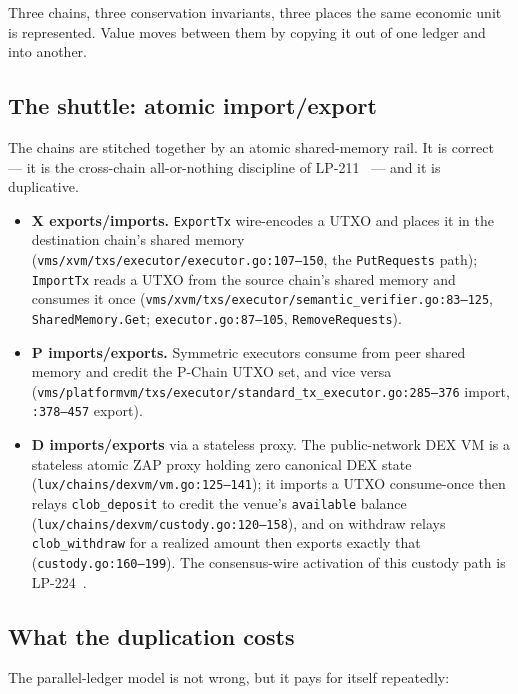 \noindent Three chains, three conservation invariants, three places the
same economic unit is represented. Value moves between them by copying
it out of one ledger and into another.

\subsection{The shuttle: atomic import/export}

The chains are stitched together by an atomic shared-memory rail. It
is correct --- it is the cross-chain all-or-nothing discipline of
LP-211~\cite{lp211} --- and it is duplicative.

\begin{itemize}[leftmargin=2em]
\item \textbf{X exports/imports.} \IMPL{} \texttt{ExportTx} wire-encodes
  a UTXO and places it in the destination chain's shared memory
  (\texttt{vms/xvm/txs/executor/executor.go:107--150}, the
  \texttt{PutRequests} path); \texttt{ImportTx} reads a UTXO from the
  source chain's shared memory and consumes it once
  (\texttt{vms/xvm/txs/executor/semantic\_verifier.go:83--125},
  \texttt{SharedMemory.Get}; \texttt{executor.go:87--105},
  \texttt{RemoveRequests}).
\item \textbf{P imports/exports.} \IMPL{} Symmetric executors consume
  from peer shared memory and credit the P-Chain UTXO set, and vice
  versa (\texttt{vms/platformvm/txs/executor/standard\_tx\_executor.go:285--376}
  import, \texttt{:378--457} export).
\item \textbf{D imports/exports} via a stateless proxy. \IMPL{} The
  public-network DEX VM is a stateless atomic ZAP proxy holding zero
  canonical DEX state (\texttt{lux/chains/dexvm/vm.go:125--141}); it
  imports a UTXO consume-once then relays \texttt{clob\_deposit} to
  credit the venue's \texttt{available} balance
  (\texttt{lux/chains/dexvm/custody.go:120--158}), and on withdraw
  relays \texttt{clob\_withdraw} for a realized amount then exports
  exactly that (\texttt{custody.go:160--199}). The consensus-wire
  activation of this custody path is LP-224~\cite{lp224}.
\end{itemize}

\subsection{What the duplication costs}

The parallel-ledger model is not wrong, but it pays for itself
repeatedly:

